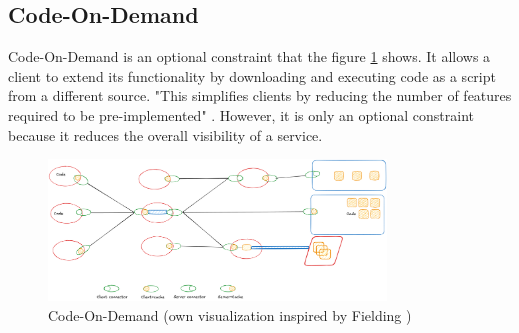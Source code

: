 \subsection{Code-On-Demand}

Code-On-Demand is an optional constraint that the figure \ref{fig:code-on-demand} shows. It allows a client to extend its functionality by downloading and executing code as a script from a different source. "This simplifies clients by reducing the number of features required to be pre-implemented" \cite{fielding2000}. However, it is only an optional constraint because it reduces the overall visibility of a service.
 
\begin{figure}[!h]
\centering
\includegraphics[width=0.8\textwidth, keepaspectratio]{figures/code-on-demand.png}
\caption{Code-On-Demand (own visualization inspired by Fielding \cite{fielding2000})}
\label{fig:code-on-demand}
\end{figure}